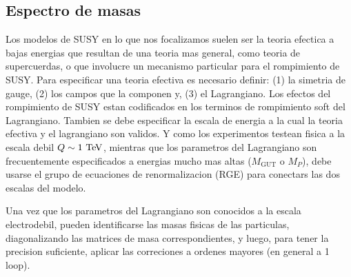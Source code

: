 




\subsection{Espectro de masas}

Los modelos de SUSY en lo que nos focalizamos suelen ser la teoria efectica a
bajas energias que resultan de una teoria mas general, como teoria de
supercuerdas, o que involucre un mecanismo particular para el rompimiento de
SUSY. Para especificar una teoria efectiva es necesario definir: (1) la simetria
de gauge, (2) los campos que la componen y, (3) el Lagrangiano. Los efectos del
rompimiento de SUSY estan codificados en los terminos de rompimiento soft del
Lagrangiano. Tambien se debe especificar la escala de energia a la cual la
teoria efectiva y el lagrangiano son validos. Y como los experimentos testean
fisica a la escala debil $Q\sim 1 \tev$, mientras que los parametros del
Lagrangiano son frecuentemente especificados a energias mucho mas altas
($M_\text{GUT}$ o $M_P$), debe usarse el grupo de ecuaciones de renormalizacion
(RGE) para conectars las dos escalas del modelo.

Una vez que los parametros del Lagrangiano son conocidos a la escala
electrodebil, pueden identificarse las masas fisicas de las particulas,
diagonalizando las matrices de masa correspondientes, y luego, para tener la precision
suficiente,  aplicar las correciones a ordenes mayores (en general a 1 loop).

